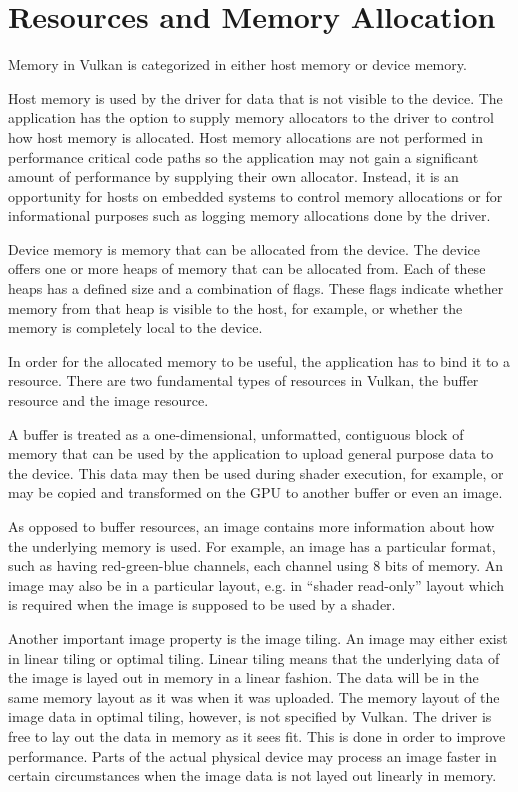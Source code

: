   \section{Resources and Memory Allocation}
  \label{sec:MemoryManagement}
    Memory in Vulkan is categorized in either \gls{host} memory or \gls{device} memory.

    Host memory is used by the \gls{driver} for data that is not visible to the device. The \gls{application} has the option to supply memory allocators to the \gls{driver} to control how \gls{host} memory is allocated. Host memory allocations are not performed in performance critical code paths so the \gls{application} may not gain a significant amount of performance by supplying their own allocator. Instead, it is an opportunity for \glspl{host} on embedded systems to control memory allocations or for informational purposes such as logging memory allocations done by the \gls{driver}.

    Device memory is memory that can be allocated from the device. The device offers one or more heaps of memory that can be allocated from. Each of these heaps has a defined size and a combination of flags. These flags indicate whether memory from that heap is visible to the \gls{host}, for example, or whether the memory is completely local to the device.

    In order for the allocated memory to be useful, the \gls{application} has to bind it to a resource. There are two fundamental types of resources in Vulkan, the buffer resource and the image resource.

    A buffer is treated as a one-dimensional, unformatted, contiguous block of memory that can be used by the \gls{application} to upload general purpose data to the device. This data may then be used during shader execution, for example, or may be copied and transformed on the GPU to another buffer or even an image.

    As opposed to buffer resources, an image contains more information about how the underlying memory is used. For example, an image has a particular format, such as having red-green-blue channels, each channel using 8 bits of memory. An image may also be in a particular layout, e.g. in ``shader read-only'' layout which is required when the image is supposed to be used by a shader.

    Another important image property is the image tiling. An image may either exist in linear tiling or optimal tiling. Linear tiling means that the underlying data of the image is layed out in memory in a linear fashion. The data will be in the same memory layout as it was when it was uploaded. The memory layout of the image data in optimal tiling, however, is not specified by Vulkan. The \gls{driver} is free to lay out the data in memory as it sees fit. This is done in order to improve performance. Parts of the actual physical device may process an image faster in certain circumstances when the image data is not layed out linearly in memory.

